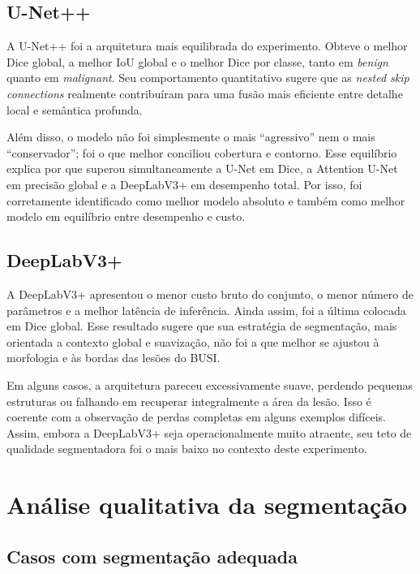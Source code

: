 \documentclass[tcc,capa]{texufpel}
\begin{document}
\subsection{U-Net++}

A U-Net++ foi a arquitetura mais equilibrada do experimento. Obteve o melhor Dice global, a melhor IoU global e o melhor Dice por classe, tanto em \textit{benign} quanto em \textit{malignant}. Seu comportamento quantitativo sugere que as \textit{nested skip connections} realmente contribuíram para uma fusão mais eficiente entre detalhe local e semântica profunda.

Além disso, o modelo não foi simplesmente o mais “agressivo” nem o mais “conservador”; foi o que melhor conciliou cobertura e contorno. Esse equilíbrio explica por que superou simultaneamente a U-Net em Dice, a Attention U-Net em precisão global e a DeepLabV3+ em desempenho total. Por isso, foi corretamente identificado como melhor modelo absoluto e também como melhor modelo em equilíbrio entre desempenho e custo.

\subsection{DeepLabV3+}

A DeepLabV3+ apresentou o menor custo bruto do conjunto, o menor número de parâmetros e a melhor latência de inferência. Ainda assim, foi a última colocada em Dice global. Esse resultado sugere que sua estratégia de segmentação, mais orientada a contexto global e suavização, não foi a que melhor se ajustou à morfologia e às bordas das lesões do BUSI.

Em alguns casos, a arquitetura pareceu excessivamente suave, perdendo pequenas estruturas ou falhando em recuperar integralmente a área da lesão. Isso é coerente com a observação de perdas completas em alguns exemplos difíceis. Assim, embora a DeepLabV3+ seja operacionalmente muito atraente, seu teto de qualidade segmentadora foi o mais baixo no contexto deste experimento.

\section{Análise qualitativa da segmentação}

\subsection{Casos com segmentação adequada}
\end{document}
